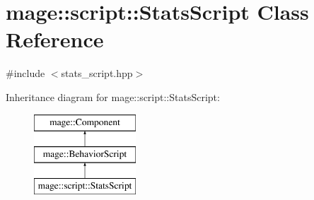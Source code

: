 \hypertarget{classmage_1_1script_1_1_stats_script}{}\section{mage\+:\+:script\+:\+:Stats\+Script Class Reference}
\label{classmage_1_1script_1_1_stats_script}


{\ttfamily \#include $<$stats\+\_\+script.\+hpp$>$}

Inheritance diagram for mage\+:\+:script\+:\+:Stats\+Script\+:\begin{figure}[H]
\begin{center}
\leavevmode
\includegraphics[height=3.000000cm]{classmage_1_1script_1_1_stats_script}
\end{center}
\end{figure}
